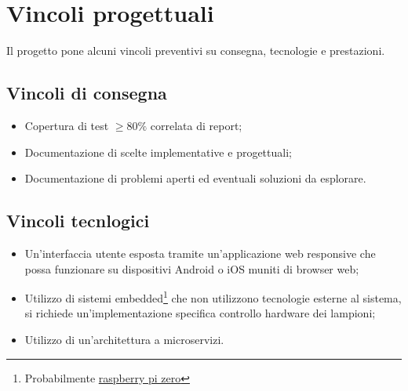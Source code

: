

\section{Vincoli progettuali}

Il progetto pone alcuni vincoli preventivi su consegna, tecnologie e prestazioni.

\subsection{Vincoli di consegna}
\begin{itemize}
    \item Copertura di test $\geq 80\%$ correlata di report;
    \item Documentazione di scelte implementative e progettuali;
    \item Documentazione di problemi aperti ed eventuali soluzioni da esplorare.
\end{itemize}

\subsection{Vincoli tecnlogici}
\begin{itemize}
    \item Un'interfaccia utente esposta tramite un'applicazione web responsive che possa funzionare su dispositivi Android o iOS muniti di browser web;
    \item Utilizzo di sistemi embedded\footnote{Probabilmente \href{https://www.raspberrypi.com/products/raspberry-pi-zero-w/}{raspberry pi zero}} che non utilizzono tecnologie esterne al sistema, si richiede un'implementazione specifica controllo hardware dei lampioni;
    \item Utilizzo di un'architettura a microservizi.
\end{itemize}

